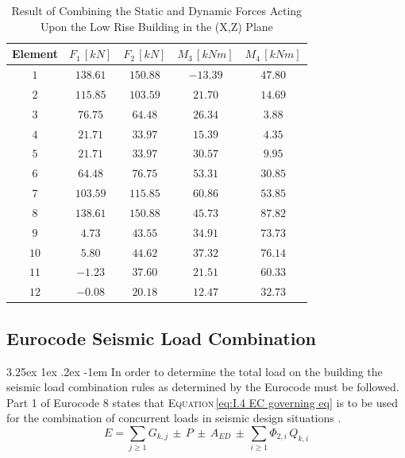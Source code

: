 \documentclass[11pt,a4paper,titlepage]{report}
\makeatletter
\renewcommand\paragraph{\@startsection{paragraph}{5}{\z@}%
  {3.25ex \@plus1ex \@minus.2ex}%
  {-1em}%
  {\normalfont\normalsize\bfseries}}
\makeatother
\begin{document}
\begin{table}[h]
    \centering
    \begin{tabular}{c|c|c|c|c}
      Element & $F_1 \,[kN]$ & $F_2 \,[kN]$ & $M_3\, [kNm]$ & $M_4 \,[kNm]$  \\
         \hline
       $1$ & $138.61 $ & $150.88$ & $-13.39$ & $47.80$ \\
       $2$ & $115.85$ & $103.59 $ & $21.70 $ & $14.69$ \\
       $3$ & $76.75 $ & $64.48 $ & $ 26.34$ & $ 3.88$ \\
       $4$ & $ 21.71$ & $33.97$ & $ 15.39 $ & $4.35$ \\
       $5$ & $21.71$ & $33.97$ & $30.57$ & $9.95$ \\
       $6$ & $ 64.48$ & $76.75$ & $53.31$ & $30.85$ \\
       $7$ & $103.59$ & $115.85 $ & $60.86$ & $53.85$ \\
       $8$ & $138.61$ & $150.88$ & $45.73 $ & $87.82$ \\
       $9$ & $4.73 $ & $43.55$ & $34.91 $ & $73.73$ \\
       $10$ & $5.80$ & $44.62$ & $37.32$ & $76.14$ \\
       $11$ & $-1.23$ & $37.60 $ & $21.51 $ & $60.33$ \\
       $12$ & $-0.08 $ & $20.18$ & $12.47 $ & $32.73$ \\
    \end{tabular}
    \caption{Result of Combining the Static and Dynamic Forces Acting Upon the Low Rise Building in the (X,Z) Plane}
    \label{tab:dynamic and static x}
\end{table}
\subsection{Eurocode Seismic Load Combination}
\paragraph{}In order to determine the total load on the building the seismic load combination rules as determined by the Eurocode must be followed. Part 1 of Eurocode 8 states that \textsc{Equation}\,\eqref{eq:I.4 EC governing eq} is to be used for the combination of concurrent loads in seismic design situations \cite{EC8}. 
\begin{equation}
    E=\sum_{j\geq1} G_{k,j}\,\pm\,P\,\pm\,A_{ED}\,\pm\,\sum_{i\geq1}\Phi_{2,i}\,Q_{k,i}
    \label{eq:I.4 EC governing eq}
\end{equation}
\end{document}
